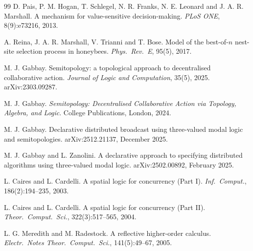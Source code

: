 \documentclass[11pt,a4paper]{article}
\theoremstyle{plain}
\theoremstyle{definition}
\theoremstyle{remark}
\begin{document}
\begin{thebibliography}{99}
 D. Pais, P. M. Hogan, T. Schlegel, N. R. Franks, N. E.
Leonard and J. A. R. Marshall. A mechanism for value-sensitive decision-making.
\emph{PLoS ONE}, 8(9):e73216, 2013.

 A. Reina, J. A. R. Marshall, V. Trianni and T. Bose.
Model of the best-of-$n$ nest-site selection process in honeybees.
\emph{Phys.\ Rev.\ E}, 95(5), 2017.

 M. J. Gabbay. Semitopology: a topological approach to
decentralised collaborative action. \emph{Journal of Logic and Computation},
35(5), 2025. arXiv:2303.09287.

 M. J. Gabbay. \emph{Semitopology: Decentralised
Collaborative Action via Topology, Algebra, and Logic}. College Publications,
London, 2024.

 M. J. Gabbay. Declarative distributed broadcast using
three-valued modal logic and semitopologies. arXiv:2512.21137, December 2025.

 M. J. Gabbay and L. Zanolini. A declarative approach to
specifying distributed algorithms using three-valued modal logic.
arXiv:2502.00892, February 2025.

 L. Caires and L. Cardelli. A spatial logic for concurrency
(Part I). \emph{Inf.\ Comput.}, 186(2):194--235, 2003.

 L. Caires and L. Cardelli. A spatial logic for concurrency
(Part II). \emph{Theor.\ Comput.\ Sci.}, 322(3):517--565, 2004.

 L. G. Meredith and M. Radestock. A reflective
higher-order calculus. \emph{Electr.\ Notes Theor.\ Comput.\ Sci.},
141(5):49--67, 2005.

\end{thebibliography}
\end{document}
